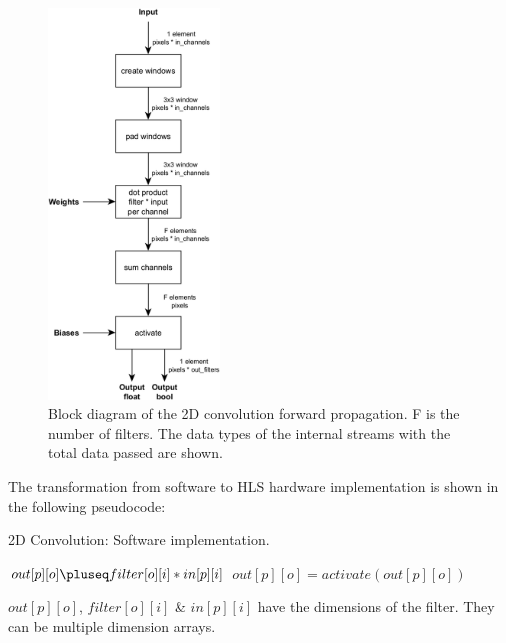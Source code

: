 \begin{figure}[H]
    \centering
        \includegraphics[width=0.406\textwidth]{Images/block_diagrams/conv2d_fp_mc.png}
        \decoRule
        \caption[Conv2D forward propagation block diagram]{Block diagram of the 2D convolution forward propagation. F is the number of filters. The data types of the internal streams with the total data passed are shown.}
        \label{fig: Conv2D forward propagation block diagram}
\end{figure}

The transformation from software to HLS hardware implementation is shown in the following pseudocode:
\begin{algorithm}[H]
    \caption[Conv2d Software implementation.]{2D Convolution: Software implementation.}
    \label{alg:Conv2d_SW}
    \begin{algorithmic}
                        \State $out[p][o] \pluseq filter[o][i] * in[p][i]$
                    \EndFor
                    \State $out[p][o] = activate(out[p][o])$
                \EndFor
            \EndFor
        \EndFunction
    \end{algorithmic}
    $out[p][o]$, $filter[o][i]$ \& $in[p][i]$ have the dimensions of the filter. They can be multiple dimension arrays.
\end{algorithm}

